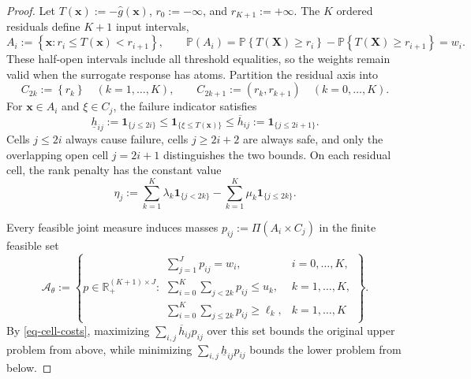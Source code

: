 \documentclass[review,11pt,3p,authoryear,nopreprintline]{elsarticle}
\begin{document}
\begin{proof}
  Let $T(\bm x):=-\hat g(\bm x)$, $r_0:=-\infty$, and $r_{K+1}:=+\infty$. The $K$ ordered residuals define $K+1$ input intervals,
  \begin{equation}
    A_i:=\left\{\bm x:r_i\le T(\bm x)<r_{i+1}\right\},\qquad
    \mathbb P\left(A_i\right)
    =\mathbb P\left\{T(\bm X)\ge r_i\right\}
    -\mathbb P\left\{T(\bm X)\ge r_{i+1}\right\}=w_i.
    \label{eq-input-cells}
  \end{equation}
  These half-open intervals include all threshold equalities, so the weights remain valid when the surrogate response has atoms. Partition the residual axis into
  \begin{equation}
    C_{2k}:=\left\{r_k\right\}\quad(k=1,\ldots,K),\qquad
    C_{2k+1}:=\left(r_k,r_{k+1}\right)\quad(k=0,\ldots,K).
    \label{eq-residual-cells}
  \end{equation}
  For $\bm x\in A_i$ and $\xi\in C_j$, the failure indicator satisfies
  \begin{equation}
    \underline h_{ij}:=\mathbf1_{\{j\le2i\}}
    \le\mathbf1_{\{\xi\le T(\bm x)\}}
    \le\overline h_{ij}:=\mathbf1_{\{j\le2i+1\}}.
    \label{eq-cell-costs}
  \end{equation}
  Cells $j\le2i$ always cause failure, cells $j\ge2i+2$ are always safe, and only the overlapping open cell $j=2i+1$ distinguishes the two bounds. On each residual cell, the rank penalty has the constant value
  \begin{equation}
    \eta_j:=\sum_{k=1}^K\lambda_k\mathbf1_{\{j<2k\}}
    -\sum_{k=1}^K\mu_k\mathbf1_{\{j\le2k\}}.
    \label{eq-dual-cell-values}
  \end{equation}

  Every feasible joint measure induces masses $p_{ij}:=\Pi(A_i\times C_j)$ in the finite feasible set
  \begin{equation}
    \mathcal A_\theta:=\left\{p\in\mathbb R_+^{(K+1)\times J}:
    \begin{array}{ll}
      \displaystyle\sum_{j=1}^Jp_{ij}=w_i,&i=0,\ldots,K,\\[1mm]
      \displaystyle\sum_{i=0}^K\sum_{j<2k}p_{ij}\le u_k,&k=1,\ldots,K,\\[1mm]
      \displaystyle\sum_{i=0}^K\sum_{j\le2k}p_{ij}\ge\ell_k,&k=1,\ldots,K
    \end{array}\right\}.
    \label{eq-cell-mass-polytope}
  \end{equation}
  By \eqref{eq-cell-costs}, maximizing $\sum_{i,j}\overline h_{ij}p_{ij}$ over this set bounds the original upper problem from above, while minimizing $\sum_{i,j}\underline h_{ij}p_{ij}$ bounds the lower problem from below.


\end{proof}
\end{document}
